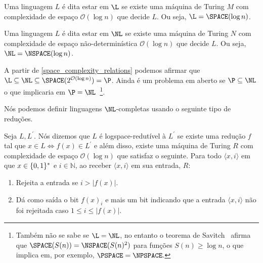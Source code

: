 \begin{defi} [As classes $\L$ e $\NL$.] \label{l_nl_defi}

    Uma linguagem $L$ é dita estar em $\L$ se existe uma máquina de Turing $M$ com complexidade de espaço $\mathcal{O}(\log n)$ que decide $L$. Ou seja, $\L = \SPACE(\log n)$.
    
    Uma linguagem $L$ é dita estar em $\NL$ se existe uma máquina de Turing $N$ com complexidade de espaço não-determinística $\mathcal{O}(\log n)$ que decide $L$. Ou seja, $\NL = \NSPACE(\log n)$.

\end{defi}

A partir de \ref{space_complexity_relations} podemos afirmar que $\L \subseteq \NL \subseteq \SPACE(2^{\mathcal{O}(\log n)}) = \P$. Ainda é um problema em aberto se $\P \subseteq \NL$ o que implicaria em $\P = \NL$~\footnote{Também não se sabe se $\L = \NL$, no entanto o teorema de Savitch~\cite{savitch1970relationships} afirma que $\SPACE(S(n)) = \NSPACE(S(n)^{2})$ para funções $S(n) \geq \log n$, o que implica em, por exemplo, $\PSPACE = \NPSPACE$.}.

Nós podemos definir linguagens $\NL$-completas usando o seguinte tipo de reduções.

\begin{defi}  \label{logspace_reductions}

    Seja $L, L^{\prime}$. Nós dizemos que $L$ é logspace-redutível à $L^{\prime}$ se existe uma redução $f$ tal que $x \in L \iff f(x) \in L^{\prime}$ e além disso, existe uma máquina de Turing $R$ com complexidade de espaço $\mathcal{O}(\log n)$ que satisfaz o seguinte. Para todo $\langle x, i \rangle$ em que $x \in \{0, 1\}^{*}$ e $i \in \mathbb{N}$, ao receber $\langle x, i \rangle$ em sua entrada, $R$:

    \begin{enumerate}
    
        \item Rejeita a entrada se $i > \lvert f(x) \rvert$.
        
        \item Dá como saída o bit $f(x)_{i}$ e mais um bit indicando que a entrada $\langle x, i \rangle$ não foi rejeitada caso $1 \leq i \leq \lvert f(x) \rvert$. 
    
    \end{enumerate}

\end{defi}

